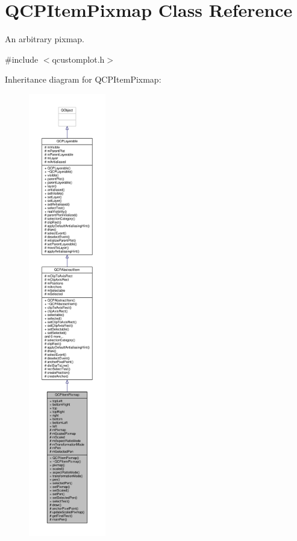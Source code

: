 \hypertarget{class_q_c_p_item_pixmap}{}\section{Q\+C\+P\+Item\+Pixmap Class Reference}
\label{class_q_c_p_item_pixmap}


An arbitrary pixmap.  




{\ttfamily \#include $<$qcustomplot.\+h$>$}



Inheritance diagram for Q\+C\+P\+Item\+Pixmap\+:\nopagebreak
\begin{figure}[H]
\begin{center}
\leavevmode
\includegraphics[height=550pt]{class_q_c_p_item_pixmap__inherit__graph}
\end{center}
\end{figure}



